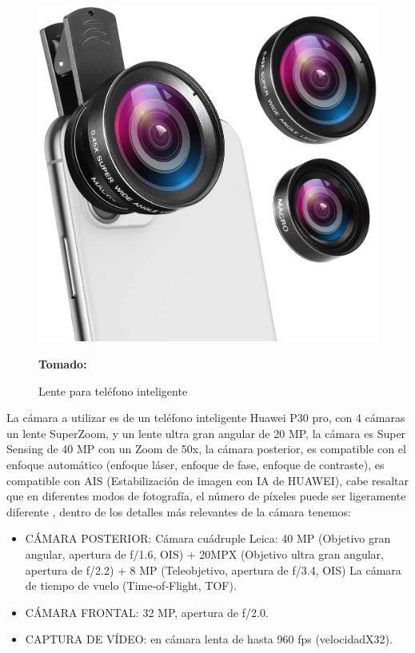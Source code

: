 \documentclass[12pt,twocolumn,a4paper]{article}
\begin{document}
\begin{figure}
	\centering
	\includegraphics[scale=0.05]{lente.jpg}
	\caption{Lente para teléfono inteligente} \textbf{Tomado:} \cite{lente}
	\label{lente}
\end{figure}

La cámara a utilizar es de un teléfono inteligente Huawei P30 pro, con 4 cámaras un lente SuperZoom, y un  lente ultra gran angular de 20 MP, la cámara es Super Sensing de 40 MP con un Zoom de 50x, la cámara posterior, es compatible con el enfoque automático (enfoque láser, enfoque de fase, enfoque de contraste), es compatible con AIS (Estabilización de imagen con IA de HUAWEI), cabe resaltar que en diferentes modos de fotografía, el número de píxeles puede ser ligeramente diferente \cite{Hawei}, dentro de los detalles más relevantes de la cámara tenemos:


\begin{itemize}
\item CÁMARA POSTERIOR: Cámara cuádruple Leica: 40 MP (Objetivo gran angular, apertura de f/1.6, OIS) + 20MPX (Objetivo ultra gran angular, apertura de f/2.2) + 8 MP (Teleobjetivo, apertura de f/3.4, OIS) La cámara de tiempo de vuelo (Time-of-Flight, TOF).
\item CÁMARA FRONTAL: 32 MP, apertura de f/2.0.
\item CAPTURA DE VÍDEO: en cámara lenta de hasta 960 fps (velocidadX32).
\end{itemize}
\end{document}
